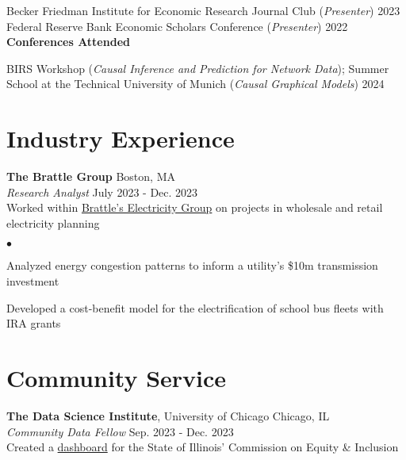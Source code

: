 \documentclass[margin,line, 10pt]{cv}
\newenvironment{list2}{
  \begin{list}{$\bullet$}{%
      \setlength{\itemsep}{0in}
      \setlength{\parsep}{0in} \setlength{\parskip}{0in}
      \setlength{\topsep}{0in} \setlength{\partopsep}{0in} 
      \setlength{\leftmargin}{0.2in}}}{\end{list}}
\begin{document}
\begin{resume}
Becker Friedman Institute for Economic Research Journal Club (\emph{Presenter}) \hfill 2023 \\ 
Federal Reserve Bank Economic Scholars Conference (\emph{Presenter}) \hfill 2022 \\ 

\vspace*{-.3cm}
{\bf Conferences Attended}
\vspace{-.3cm}

BIRS Workshop (\emph{Causal Inference and Prediction for Network Data}); Summer School at the Technical University of Munich (\emph{Causal Graphical Models}) \hfill 2024

\section{\sc Industry Experience}
{\bf The Brattle Group} \hfill Boston, MA\\ 
{\em Research Analyst} \hfill {July 2023 - Dec. 2023}\\
Worked within \href{https://www.brattle.com/practices/electricity-wholesale-markets-planning/}{Brattle's Electricity Group} on projects in wholesale and retail electricity planning

\vspace*{.05in}  
\begin{list2}
\item Analyzed energy congestion patterns to inform a utility’s \$10m transmission investment
\item Developed a cost-benefit model for the electrification of school bus fleets with IRA grants
\end{list2}

\section{\sc Community Service}
{\bf The Data Science Institute}, University of Chicago \hfill Chicago, IL\\ 
{\em Community Data Fellow} \hfill {Sep. 2023 - Dec. 2023}\\
Created a \href{https://public.tableau.com/app/profile/daniel.posmik/viz/DSI_CEI_Dashboard_draft/Dashboard1}{dashboard} for the State of Illinois' Commission on Equity \& Inclusion


\end{resume}
\end{document}
